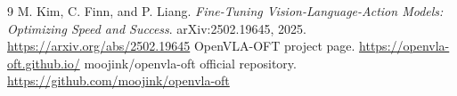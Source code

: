 \documentclass[11pt]{article}
\begin{document}
\begin{thebibliography}{9}
 M. Kim, C. Finn, and P. Liang. \emph{Fine-Tuning Vision-Language-Action Models: Optimizing Speed and Success}. arXiv:2502.19645, 2025. \url{https://arxiv.org/abs/2502.19645}
 OpenVLA-OFT project page. \url{https://openvla-oft.github.io/}
 moojink/openvla-oft official repository. \url{https://github.com/moojink/openvla-oft}
\end{thebibliography}
\end{document}

